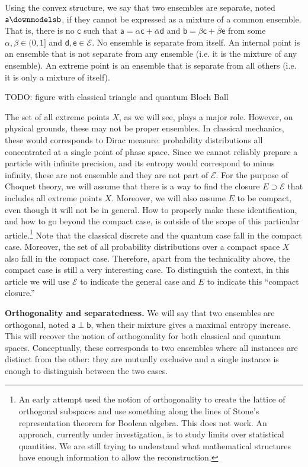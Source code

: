 \documentclass[10pt,twocolumn, nofootinbib]{revtex4-2}
\newcommand{\ens}[1][e] {\mathsf{#1}} %
\newcommand{\Ens}[1][E] {\mathcal{#1}} %
\def\ortho{\perp}
\def\separate{\downmodels}
\begin{document}
Using the convex structure, we say that two ensembles are separate, noted $\ens[a] \separate \ens[b]$, if they cannot be expressed as a mixture of a common ensemble. That is, there is no $\ens[c]$ such that $\ens[a] = \alpha \ens[c] + \bar{\alpha} \ens[d]$ and $\ens[b] = \beta \ens[c] + \bar{\beta} \ens$ from some $\alpha, \beta \in (0,1]$ and $\ens[d],\ens \in \Ens$. No ensemble is separate from itself. An internal point is an ensemble that is not separate from any ensemble (i.e. it is the mixture of any ensemble). An extreme point is an ensemble that is separate from all others (i.e. it is only a mixture of itself).

TODO: figure with classical triangle and quantum Bloch Ball

The set of all extreme points $X$, as we will see, plays a major role. However, on physical grounds, these may not be proper ensembles. In classical mechanics, these would corresponds to Dirac measure: probability distributions all concentrated at a single point of phase space. Since we cannot reliably prepare a particle with infinite precision, and its entropy would correspond to minus infinity, these are not ensemble and they are not part of $\Ens$. For the purpose of Choquet theory, we will assume that there is a way to find the closure $E \supset \Ens$ that includes all extreme points $X$. Moreover, we will also assume $E$ to be compact, even though it will not be in general. How to properly make these identification, and how to go beyond the compact case, is outside of the scope of this particular article.\footnote{An early attempt used the notion of orthogonality to create the lattice of orthogonal subspaces and use something along the lines of Stone's representation theorem for Boolean algebra. This does not work. An approach, currently under investigation, is to study limits over statistical quantities. We are still trying to understand what mathematical structures have enough information to allow the reconstruction.} Note that the classical discrete and the quantum case fall in the compact case. Moreover, the set of all probability distributions over a compact space $X$ also fall in the compact case. Therefore, apart from the technicality above, the compact case is still a very interesting case. To distinguish the context, in this article we will use $\Ens$ to indicate the general case and $E$ to indicate this ``compact closure.''

\textbf{Orthogonality and separatedness.} We will say that two ensembles are orthogonal, noted $\ens[a] \ortho \ens[b]$, when their mixture gives a maximal entropy increase. This will recover the notion of orthogonality for both classical and quantum spaces. Conceptually, these corresponds to two ensembles where all instances are distinct from the other: they are mutually exclusive and a single instance is enough to distinguish between the two cases. 
\end{document}
